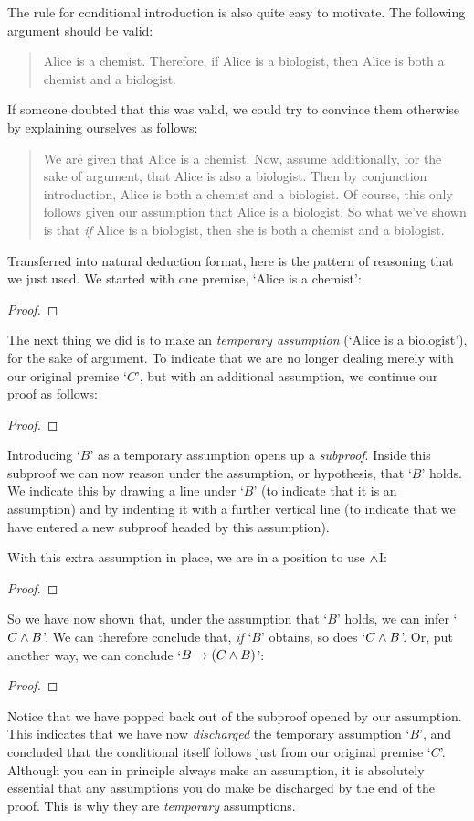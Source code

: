 The rule for conditional introduction is also quite easy to motivate. The following argument should be valid:
	\begin{quote}
		Alice is a chemist. Therefore, if Alice is a biologist, then Alice is both a chemist and a biologist.
	\end{quote}
If someone doubted that this was valid, we could try to convince them otherwise by explaining ourselves as follows:
\begin{quote}
We are given that Alice is a chemist. Now, assume additionally, for the sake of argument, that Alice is also a biologist. Then by conjunction introduction, Alice is both a chemist and a biologist. Of course, this only follows given our assumption that Alice is a biologist. So what we've shown is that \emph{if} Alice is a biologist, then she is both a chemist and a biologist.
\end{quote}
Transferred into natural deduction format, here is the pattern of reasoning that we just used. We started with one premise, `Alice is a chemist':
	\begin{proof}
		  
	\end{proof}
The next thing we did is to make an \emph{temporary assumption} (`Alice is a biologist'), for the sake of argument. To indicate that we are no longer dealing merely with our original premise `$C$', but with an additional assumption, we continue our proof as follows:
	\begin{proof}
		  
		\open
			 
			\have[\ ]{}{}
	\end{proof}
Introducing `$B$' as a temporary assumption opens up a \emph{subproof}.  Inside this subproof we can now reason under the assumption, or hypothesis, that `$B$' holds. We indicate this by drawing a line under `$B$' (to indicate that it is an assumption) and by indenting it with a further vertical line (to indicate that we have entered a new subproof headed by this assumption).

With this extra assumption in place, we are in a position to use $\wedge$I:
	\begin{proof}
		  
		\open
			 
	\end{proof}
So we have now shown that, under the assumption that `$B$' holds, we can infer `$C \wedge B$'. We can therefore conclude that, \emph{if} `$B$' obtains, so does `$C \wedge B$'. Or, put another way, we can conclude `$B \rightarrow (C \wedge B)$':
	\begin{proof}
		\open
			\close
	\end{proof}
Notice that we have popped back out of the subproof opened by our assumption.  This indicates that we have now \emph{discharged} the temporary assumption `$B$', and concluded that the conditional itself follows just from our original premise `$C$'.  Although you can in principle always make an assumption, it is absolutely essential that any assumptions you do make be discharged by the end of the proof.  This is why they are \emph{temporary} assumptions.

